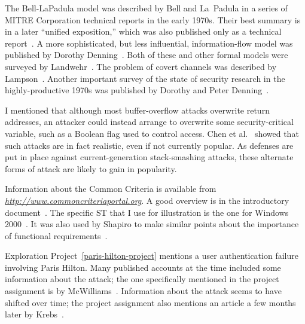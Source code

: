 The Bell-LaPadula model was described by Bell and La~Padula in a
series of MITRE Corporation technical reports in the early 1970s.
Their best summary is in a later ``unified exposition,'' which was
also published only as a technical report~\cite{max1158}.  A more
sophisticated, but less influential, information-flow model was
published by Dorothy Denning~\cite{max1037}. Both of these and other
formal models were surveyed by Landwehr~\cite{max1038}.  The problem
of covert channels was described by Lampson~\cite{max1159}.  Another
important survey of the state of security research in the
highly-productive 1970s was published by Dorothy and Peter
Denning~\cite{max1046}.

I mentioned that although most buffer-overflow attacks overwrite
return addresses, an attacker could instead arrange to overwrite some
security-critical variable, such as a Boolean flag used to control
access.  Chen et al.~\cite{max1176} showed that such attacks are in
fact realistic, even if not currently popular.  As defenses are put in
place against current-generation stack-smashing attacks, these
alternate forms of attack are likely to gain in popularity.

Information about the Common Criteria is available from
\textit{\url{http://www.commoncriteriaportal.org}}.  A good overview is in the introductory
document~\cite{max1161}.  The specific ST that I use for illustration
is the one for Windows 2000~\cite{max1160}.  It was also used by
Shapiro to make similar points about the importance of functional
requirements~\cite{max1163}.

Exploration Project~\ref{paris-hilton-project} mentions a user
authentication failure involving Paris Hilton.  Many published
accounts at the time included some information about the attack; the
one specifically mentioned in the project assignment is by
McWilliams~\cite{max1162}.  Information about the attack seems to have shifted over time;
the project assignment also mentions an article a few months later by
Krebs~\cite{max1177}.
